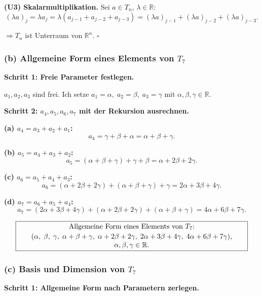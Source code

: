 \documentclass[a4paper,12pt]{article}
\begin{document}
\textbf{(U3) Skalarmultiplikation.} Sei $a \in T_n$, $\lambda \in \mathbb{R}$:
\[
(\lambda a)_j = \lambda a_j = \lambda(a_{j-1} + a_{j-2} + a_{j-3}) = (\lambda a)_{j-1} + (\lambda a)_{j-2} + (\lambda a)_{j-3}.
\]
\checkmark

$\Rightarrow T_n$ ist Unterraum von $\mathbb{R}^n$. $\square$

\subsubsection*{(b) Allgemeine Form eines Elements von $T_7$}

\textbf{Schritt 1: Freie Parameter festlegen.}

$a_1, a_2, a_3$ sind frei. Ich setze $a_1 = \alpha,\; a_2 = \beta,\; a_3 = \gamma$ mit $\alpha, \beta, \gamma \in \mathbb{R}$.

\textbf{Schritt 2: $a_4, a_5, a_6, a_7$ mit der Rekursion ausrechnen.}

\textbf{(a) $a_4 = a_3 + a_2 + a_1$:}
\[
a_4 = \gamma + \beta + \alpha = \alpha + \beta + \gamma.
\]

\textbf{(b) $a_5 = a_4 + a_3 + a_2$:}
\[
a_5 = (\alpha + \beta + \gamma) + \gamma + \beta = \alpha + 2\beta + 2\gamma.
\]

\textbf{(c) $a_6 = a_5 + a_4 + a_3$:}
\[
a_6 = (\alpha + 2\beta + 2\gamma) + (\alpha + \beta + \gamma) + \gamma = 2\alpha + 3\beta + 4\gamma.
\]

\textbf{(d) $a_7 = a_6 + a_5 + a_4$:}
\[
a_7 = (2\alpha + 3\beta + 4\gamma) + (\alpha + 2\beta + 2\gamma) + (\alpha + \beta + \gamma) = 4\alpha + 6\beta + 7\gamma.
\]

\[
\fbox{\parbox{0.93\textwidth}{\centering
Allgemeine Form eines Elements von $T_7$:\\[2pt]
$(\alpha,\; \beta,\; \gamma,\; \alpha+\beta+\gamma,\; \alpha+2\beta+2\gamma,\; 2\alpha+3\beta+4\gamma,\; 4\alpha+6\beta+7\gamma)$,\; $\alpha, \beta, \gamma \in \mathbb{R}$.
}}
\]

\subsubsection*{(c) Basis und Dimension von $T_7$}

\textbf{Schritt 1: Allgemeine Form nach Parametern zerlegen.}
\end{document}
